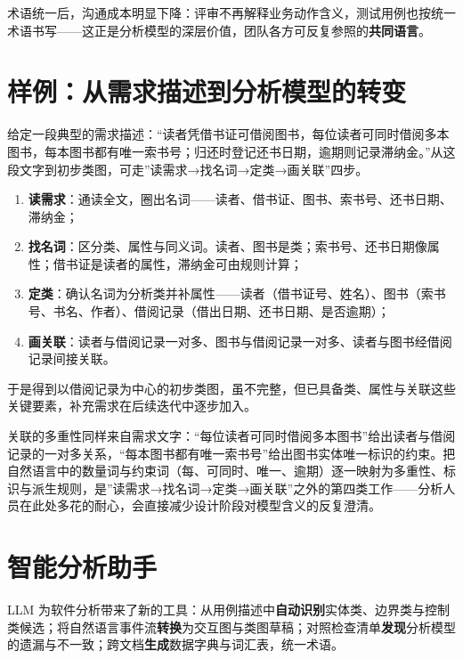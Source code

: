 \documentclass[12pt,a4paper,twoside,openany]{ctexbook}
\numberwithin{figure}{chapter}
\numberwithin{table}{chapter}
\providecommand{\tightlist}{\setlength{\itemsep}{0pt}\setlength{\parskip}{0pt}}
\begin{document}
术语统一后，沟通成本明显下降：评审不再解释业务动作含义，测试用例也按统一术语书写------这正是分析模型的深层价值，团队各方可反复参照的\textbf{共同语言}。

\section{样例：从需求描述到分析模型的转变}\label{ux6837ux4f8bux4eceux9700ux6c42ux63cfux8ff0ux5230ux5206ux6790ux6a21ux578bux7684ux8f6cux53d8}

给定一段典型的需求描述：``读者凭借书证可借阅图书，每位读者可同时借阅多本图书，每本图书都有唯一索书号；归还时登记还书日期，逾期则记录滞纳金。''从这段文字到初步类图，可走''读需求→找名词→定类→画关联''四步。

\begin{enumerate}
\def\labelenumi{\arabic{enumi}.}
\tightlist
\item
  \textbf{读需求}：通读全文，圈出名词------读者、借书证、图书、索书号、还书日期、滞纳金；
\item
  \textbf{找名词}：区分类、属性与同义词。读者、图书是类；索书号、还书日期像属性；借书证是读者的属性，滞纳金可由规则计算；
\item
  \textbf{定类}：确认名词为分析类并补属性------读者（借书证号、姓名）、图书（索书号、书名、作者）、借阅记录（借出日期、还书日期、是否逾期）；
\item
  \textbf{画关联}：读者与借阅记录一对多、图书与借阅记录一对多、读者与图书经借阅记录间接关联。
\end{enumerate}

于是得到以借阅记录为中心的初步类图，虽不完整，但已具备类、属性与关联这些关键要素，补充需求在后续迭代中逐步加入。

关联的多重性同样来自需求文字：``每位读者可同时借阅多本图书''给出读者与借阅记录的一对多关系，``每本图书都有唯一索书号''给出图书实体唯一标识的约束。把自然语言中的数量词与约束词（每、可同时、唯一、逾期）逐一映射为多重性、标识与派生规则，是''读需求→找名词→定类→画关联''之外的第四类工作------分析人员在此处多花的耐心，会直接减少设计阶段对模型含义的反复澄清。

\section{智能分析助手}\label{ux667aux80fdux5206ux6790ux52a9ux624b}

LLM
为软件分析带来了新的工具：从用例描述中\textbf{自动识别}实体类、边界类与控制类候选；将自然语言事件流\textbf{转换}为交互图与类图草稿；对照检查清单\textbf{发现}分析模型的遗漏与不一致；跨文档\textbf{生成}数据字典与词汇表，统一术语。
\end{document}
